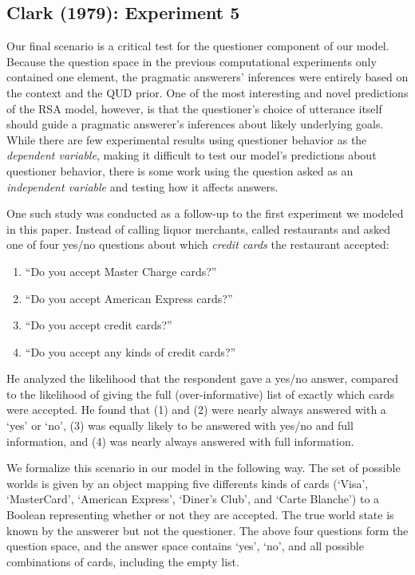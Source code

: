 \documentclass[12pt, floatsintext, jou]{apa6}
\begin{document}
\subsection{Clark (1979): Experiment 5}
Our final scenario is a critical test for the questioner component of our model. Because the question space in the previous computational experiments only contained one element, the pragmatic answerers' inferences were entirely based on the context and the QUD prior. One of the most interesting and novel predictions of the RSA model, however, is that the questioner's choice of utterance itself should guide a pragmatic answerer's inferences about likely underlying goals. While there are few experimental results using questioner behavior as the \emph{dependent variable}, making it difficult to test our model's predictions about questioner behavior, there is some work using the question asked as an \emph{independent variable} and testing how it affects answers.

One such study was conducted as a follow-up to the first experiment we modeled in this paper. Instead of calling liquor merchants,  called restaurants and asked one of four yes/no questions about which \emph{credit cards} the restaurant accepted:

\begin{enumerate}
\item ``Do you accept Master Charge cards?'' 
\item ``Do you accept American Express cards?''
\item ``Do you accept credit cards?'' 
\item ``Do you accept any kinds of credit cards?'' 
\end{enumerate}

He analyzed the likelihood that the respondent gave a yes/no answer, compared to the likelihood of giving the full (over-informative) list of exactly which cards were accepted.  He found that (1) and (2) were nearly always answered with a `yes' or `no', (3) was equally likely to be answered with yes/no and full information, and (4) was nearly always answered with full information. 

We formalize this scenario in our model in the following way. The set of possible worlds is given by an object mapping five differents kinds of cards (`Visa', `MasterCard', `American Express', `Diner's Club', and `Carte Blanche') to a Boolean representing whether or not they are accepted. The true world state is known by the answerer but not the questioner. The above four questions form the question space, and the answer space contains `yes', `no', and all possible combinations of cards, including the empty list.
\end{document}
